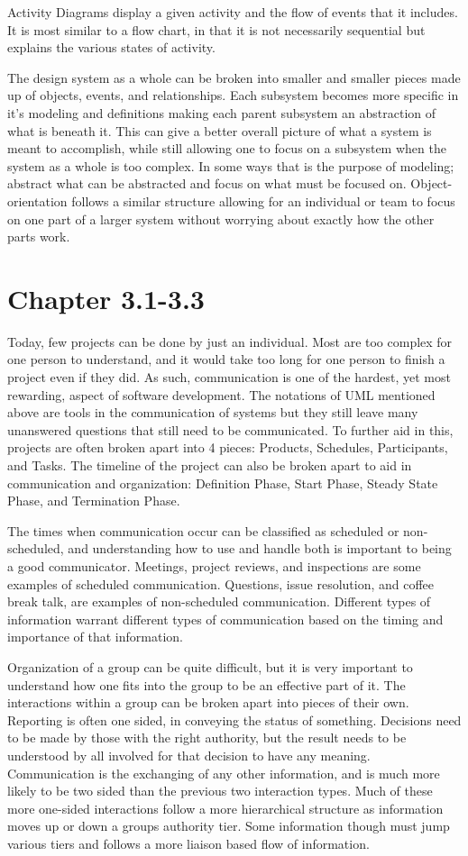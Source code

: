 \documentclass[prb,preprint]{revtex4-2}
\begin{document}
Activity Diagrams display a given activity and the flow of events that it includes. It is most similar to a flow chart, in that it is not necessarily sequential but explains the various states of activity.

The design system as a whole can be broken into smaller and smaller pieces made up of objects, events, and relationships. Each subsystem becomes more specific in it's modeling and definitions making each parent subsystem an abstraction of what is beneath it. This can give a better overall picture of what a system is meant to accomplish, while still allowing one to focus on a subsystem when the system as a whole is too complex. In some ways that is the purpose of modeling; abstract what can be abstracted and focus on what must be focused on. Object-orientation follows a similar structure allowing for an individual or team to focus on one part of a larger system without worrying about exactly how the other parts work.

\section*{Chapter 3.1-3.3}
Today, few projects can be done by just an individual. Most are too complex for one person to understand, and it would take too long for one person to finish a project even if they did. As such, communication is one of the hardest, yet most rewarding, aspect of software development. The notations of UML mentioned above are tools in the communication of systems but they still leave many unanswered questions that still need to be communicated. To further aid in this, projects are often broken apart into 4 pieces: Products, Schedules, Participants, and Tasks. The timeline of the project can also be broken apart to aid in communication and organization: Definition Phase, Start Phase, Steady State Phase, and Termination Phase.

The times when communication occur can be classified as scheduled or non-scheduled, and understanding how to use and handle both is important to being a good communicator. Meetings, project reviews, and inspections are some examples of scheduled communication. Questions, issue resolution, and coffee break talk, are examples of non-scheduled communication. Different types of information warrant different types of communication based on the timing and importance of that information. 

Organization of a group can be quite difficult, but it is very important to understand how one fits into the group to be an effective part of it. The interactions within a group can be broken apart into pieces of their own. Reporting is often one sided, in conveying the status of something. Decisions need to be made by those with the right authority, but the result needs to be understood by all involved for that decision to have any meaning. Communication is the exchanging of any other information, and is much more likely to be two sided than the previous two interaction types. Much of these more one-sided interactions follow a more hierarchical structure as information moves up or down a groups authority tier. Some information though must jump various tiers and follows a more liaison based flow of information.
\end{document}
